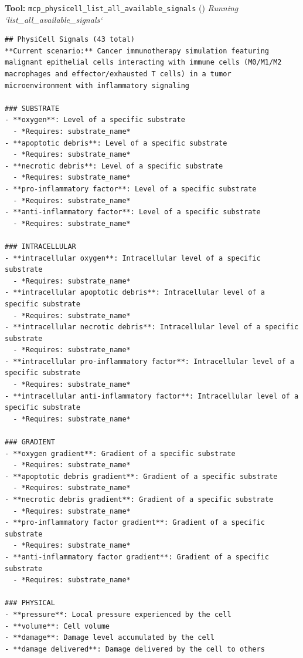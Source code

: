 \documentclass[11pt,a4paper]{article}
\begin{document}
\begin{toolokbox}
\textbf{Tool:} \texttt{mcp\_physicell\_list\_all\_available\_signals} (\checkmark)
\textit{Running `list\_all\_available\_signals`}
\begin{lstlisting}
## PhysiCell Signals (43 total)
**Current scenario:** Cancer immunotherapy simulation featuring malignant epithelial cells interacting with immune cells (M0/M1/M2 macrophages and effector/exhausted T cells) in a tumor microenvironment with inflammatory signaling

### SUBSTRATE
- **oxygen**: Level of a specific substrate
  - *Requires: substrate_name*
- **apoptotic debris**: Level of a specific substrate
  - *Requires: substrate_name*
- **necrotic debris**: Level of a specific substrate
  - *Requires: substrate_name*
- **pro-inflammatory factor**: Level of a specific substrate
  - *Requires: substrate_name*
- **anti-inflammatory factor**: Level of a specific substrate
  - *Requires: substrate_name*

### INTRACELLULAR
- **intracellular oxygen**: Intracellular level of a specific substrate
  - *Requires: substrate_name*
- **intracellular apoptotic debris**: Intracellular level of a specific substrate
  - *Requires: substrate_name*
- **intracellular necrotic debris**: Intracellular level of a specific substrate
  - *Requires: substrate_name*
- **intracellular pro-inflammatory factor**: Intracellular level of a specific substrate
  - *Requires: substrate_name*
- **intracellular anti-inflammatory factor**: Intracellular level of a specific substrate
  - *Requires: substrate_name*

### GRADIENT
- **oxygen gradient**: Gradient of a specific substrate
  - *Requires: substrate_name*
- **apoptotic debris gradient**: Gradient of a specific substrate
  - *Requires: substrate_name*
- **necrotic debris gradient**: Gradient of a specific substrate
  - *Requires: substrate_name*
- **pro-inflammatory factor gradient**: Gradient of a specific substrate
  - *Requires: substrate_name*
- **anti-inflammatory factor gradient**: Gradient of a specific substrate
  - *Requires: substrate_name*

### PHYSICAL
- **pressure**: Local pressure experienced by the cell
- **volume**: Cell volume
- **damage**: Damage level accumulated by the cell
- **damage delivered**: Damage delivered by the cell to others


\end{lstlisting}
\end{toolokbox}
\end{document}
